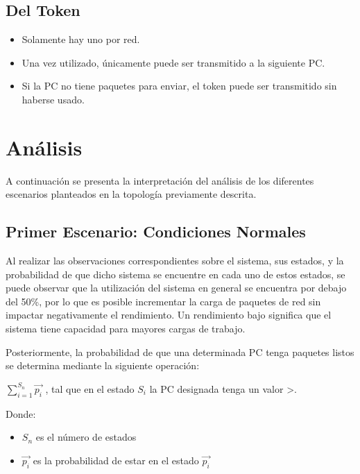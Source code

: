 \documentclass[12pt,letterpaper,oneside]{article}
\begin{document}
      \subsection{Del Token}
      
        \begin{itemize}
          \item Solamente hay uno por red.
          \item Una vez utilizado, únicamente puede ser transmitido a la siguiente PC.
          \item Si la PC no tiene paquetes para enviar, el token puede ser transmitido sin haberse usado.
        \end{itemize}
        
      \section{Análisis}
      \noindent A continuación se presenta la interpretación del análisis de los diferentes escenarios planteados en la topología previamente descrita.
      
      \subsection{Primer Escenario: Condiciones Normales}
      Al realizar las observaciones correspondientes sobre el sistema, sus estados, y la probabilidad de que dicho sistema se encuentre en cada uno de estos estados, se puede observar que la utilización del sistema en general se encuentra por debajo del 50\%, por lo que es posible incrementar la carga de paquetes de red sin impactar negativamente el rendimiento. Un rendimiento bajo significa que el sistema tiene capacidad para mayores cargas de trabajo.
      
      Posteriormente, la probabilidad de que una determinada PC tenga paquetes listos se determina mediante la siguiente operación:
      
      $\displaystyle\sum_{i=1}^{S_n} \vec{p_i}$ , tal que en el estado $S_i$ la PC designada tenga un valor \textgreater {}.
      
      Donde:
      \begin{itemize}
        \item $S_n$ es el número de estados
        \item $\vec{p_i}$ es la probabilidad de estar en el estado $\vec{p_i}$
      \end{itemize}
      
\end{document}
